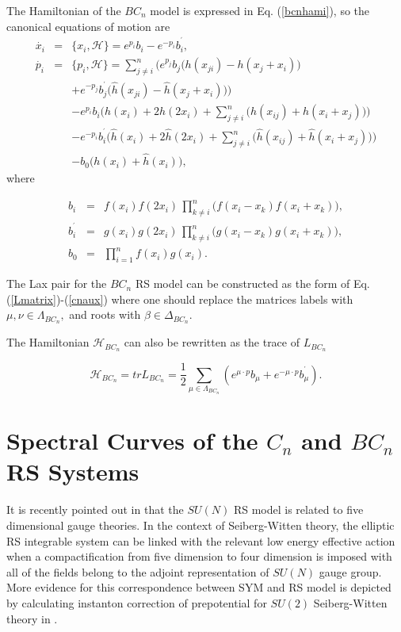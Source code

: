 \documentclass[a4paper,12pt]{article}
\begin{document}
The Hamiltonian of the $BC_{n}$ model is expressed in Eq.
(\ref{bcnhami}), so the canonical equations of motion are
\begin{eqnarray}
\dot{x_{i}} &=&\{x_{i},\mathcal{H}\}=e^{p_{i}}b_{i}-e^{-p_{i}}b_{i}^{^{
\prime }},  \label{mobcn1} \\
\dot{p_{i}} &=&\{p_{i},\mathcal{H}\}=\sum_{j\neq i}^{n}\Big(e^{p_{j}}b_{j}
\big(h(x_{ji})-h(x_{j}+x_{i})\big)  \nonumber \\
&&+e^{-p_{j}}b_{j}^{^{\prime
}}\big(\hat{h}(x_{ji})-\hat{h}(x_{j}+x_{i})\big)
\Big)  \nonumber \\
&&-e^{p_{i}}b_{i}\Big(h(x_{i})+2h(2x_{i})+\sum_{j\neq
i}^{n}\big(h(x_{ij})+h(x_{i}+x_{j})\big)\Big)  \nonumber
\\ &&-e^{-p_{i}}b_{i}^{^{\prime
}}\Big(\hat{h}(x_{i})+2\hat{h} (2x_{i})+\sum_{j\neq
i}^{n}\big(\hat{h}(x_{ij})+\hat{h}(x_{i}+x_{j})\big)
\Big)  \nonumber \\
&&-b_{0}\Big(h(x_{i})+\hat{h}(x_{i})\Big),  \label{mobcn2}
\end{eqnarray}
where

\begin{eqnarray}
b_{i} &=&f(x_{i})f(2x_{i})\,\prod_{k\neq i}^{n}\Big(
f(x_{i}-x_{k})f(x_{i}+x_{k})\Big),  \nonumber \\
b_{i}^{^{\prime }} &=&g(x_{i})g(2x_{i})\,\prod_{k\neq
i}^{n}\Big( g(x_{i}-x_{k})g(x_{i}+x_{k})\Big), \\ b_{0}
&=&\prod_{i=1}^{n}f(x_{i})g(x_{i}).  \nonumber
\end{eqnarray}

The Lax pair for the $BC_{n}$ RS model can be constructed as
the form of Eq. (\ref{Lmatrix})-(\ref{cnaux}) where one
should replace the matrices labels with $\mu ,\nu \in
\Lambda _{BC_{n}},$ and roots with $\beta \in \Delta
_{BC_{n}}.$

The Hamiltonian $\mathcal{H}_{BC_{n}}$ can also be rewritten
as the trace of $L_{BC_{n}}$

\begin{equation}
\mathcal{H}_{BC_{n}}=trL_{BC_{n}}=\frac{1}{2}\sum_{\mu \in \Lambda
_{BC_{n}}}(e^{\mu \cdot p}b_{\mu }+e^{-\mu \cdot p}b_{\mu }^{^{\prime }}).
\end{equation}

\section{Spectral Curves of the $C_{n}$ and $BC_{n}$ RS Systems}

\setcounter{equation}{0} \label{spec} It is recently pointed out in \cite
{n,bm1,mir,mir1} that the $SU(N)$ RS model is related to five
dimensional gauge theories. In the context of Seiberg-Witten
theory, the elliptic RS integrable system can be linked with
the relevant low energy effective action when a
compactification from five dimension to four dimension is
imposed with all of the fields belong to the adjoint
representation of $SU(N) $ gauge group\cite{bm1}. More
evidence for this correspondence between SYM and RS model is
depicted by calculating instanton correction of prepotential
for $SU(2) $ Seiberg-Witten theory in \cite{ohta}.
\end{document}
